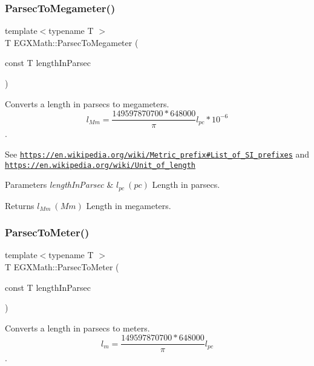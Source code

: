 \subsubsection{\texorpdfstring{Parsec\+To\+Megameter()}{ParsecToMegameter()}}
{\footnotesize\ttfamily template$<$typename T $>$ \\
T E\+G\+X\+Math\+::\+Parsec\+To\+Megameter (\begin{DoxyParamCaption}\item[{const T}]{length\+In\+Parsec }\end{DoxyParamCaption})}



Converts a length in parsecs to megameters. \[ l_{Mm}=\frac{149597870700 * 648000}{\pi}l_{pc} * 10^{-6} \]. 

See \href{https://en.wikipedia.org/wiki/Metric_prefix#List_of_SI_prefixes}{\tt https\+://en.\+wikipedia.\+org/wiki/\+Metric\+\_\+prefix\#\+List\+\_\+of\+\_\+\+S\+I\+\_\+prefixes} and \href{https://en.wikipedia.org/wiki/Unit_of_length}{\tt https\+://en.\+wikipedia.\+org/wiki/\+Unit\+\_\+of\+\_\+length} 
\begin{DoxyParams}{Parameters}
{\em length\+In\+Parsec} & $ l_{pc}\ (pc)$ Length in parsecs. \\
\hline
\end{DoxyParams}
\begin{DoxyReturn}{Returns}
$ l_{Mm}\ (Mm)$ Length in megameters. 
\end{DoxyReturn}
\mbox{\label{group___e_g_x_math-_conversions-_length_conversions-_astronomical-_parsec-_s_i_gaa97ff0501ce04074bf9aacafc2135532}} 
\subsubsection{\texorpdfstring{Parsec\+To\+Meter()}{ParsecToMeter()}}
{\footnotesize\ttfamily template$<$typename T $>$ \\
T E\+G\+X\+Math\+::\+Parsec\+To\+Meter (\begin{DoxyParamCaption}\item[{const T}]{length\+In\+Parsec }\end{DoxyParamCaption})}



Converts a length in parsecs to meters. \[ l_{m}=\frac{149597870700 * 648000}{\pi}l_{pc} \]. 


